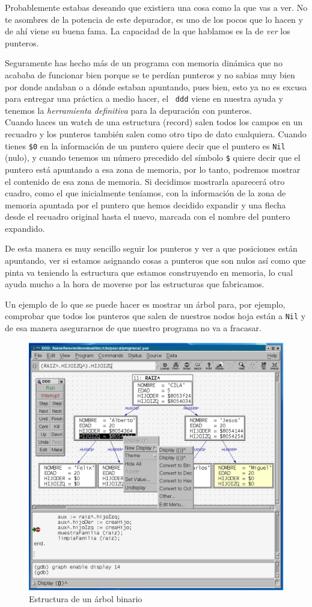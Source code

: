 Probablemente estabas deseando que existiera  una cosa como la que vas
a ver. No te asombres de la  potencia de este depurador, es uno de los
pocos que lo  hacen y de ahí  viene su buena fama. La  capacidad de la
que hablamos es la de {\em ver} los punteros.

Seguramente has hecho  más de un programa con memoria  dinámica que no
acababa de  funcionar bien porque se  te perdían punteros y  no sabias
muy bien  por donde andaban  o a  dónde estaban apuntando,  pues bien,
esto ya no es excusa para entregar una práctica a medio hacer, el {\tt
ddd} viene en nuestra ayuda  y tenemos la {\em herramienta definitiva}
para la depuración con punteros.\\

Cuando  haces un  watch de  una  estructura (record)  salen todos  los
campos en un  recuadro y los punteros también salen  como otro tipo de
dato  cualquiera. Cuando  tienes {\tt  \$0}  en la  información de  un
puntero quiere  decir que  el puntero  es {\tt  Nil} (nulo),  y cuando
tenemos un número  precedido del símbolo {\tt \$} quiere  decir que el
puntero está apuntando  a esa zona de memoria, por  lo tanto, podremos
mostrar el  contenido de esa  zona de memoria. Si  decidimos mostrarla
aparecerá  otro cuadro,  como  el que  inicialmente  teníamos, con  la
información de  la zona de memoria  apuntada por el puntero  que hemos
decidido expandir  y una  flecha desde el  recuadro original  hasta el
nuevo, marcada con el nombre del puntero expandido.

De  esta manera  es  muy sencillo  seguir  los punteros  y  ver a  que
posiciones están apuntando, ver si  estamos asignando cosas a punteros
que son nulos así como que pinta va teniendo la estructura que estamos
construyendo en memoria, lo cual ayuda  mucho a la hora de moverse por
las estructuras que fabricamos.

Un ejemplo  de lo  que se puede  hacer es mostrar  un árbol  para, por
ejemplo, comprobar que todos los  punteros que salen de nuestros nodos
hoja están  a {\tt  Nil} y  de esa manera  asegurarnos de  que nuestro
programa no va a fracasar.

\begin{figure}[hbtp]
\centering
\includegraphics[width=\textwidth]{imagenes/ddd_punteros.eps}
\caption{Estructura de un árbol binario}
\end{figure}
